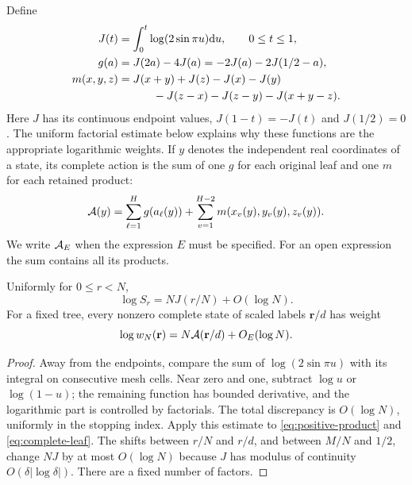 Define
\begin{align}
 J(t)&=\int_0^t\log(2\sin\pi u)\dd u,\qquad 0\le t\le1,
       \label{st:J}\\
 g(a)&=J(2a)-4J(a)
       =-2J(a)-2J(1/2-a),\label{st:g}\\
 m(x,y,z)&=J(x+y)+J(z)-J(x)-J(y)\notag\\
 &\hspace{11mm}-J(z-x)-J(z-y)-J(x+y-z).
       \label{st:m}
\end{align}
Here $J$ has its continuous endpoint values,
$J(1-t)=-J(t)$ and $J(1/2)=0$.
The uniform factorial estimate below explains why these functions
are the appropriate logarithmic weights. If $y$ denotes the independent
real coordinates of a state, its complete action is the sum of one $g$ for each
original leaf and one $m$ for each retained product:
\begin{equation}\label{st:action}
 \mathcal A(y)=\sum_{\ell=1}^H g(a_\ell(y))
             +\sum_{v=1}^{H-2}m(x_v(y),y_v(y),z_v(y)).
\end{equation}
We write $\mathcal A_E$ when the expression $E$ must be specified.
For an open expression the sum contains all its products.

\begin{lemma}\label{lem:factorial-action}
Uniformly for $0\le r<N$,
\[
 \log S_r=NJ(r/N)+O(\log N).
\]
For a fixed tree, every nonzero complete state of scaled labels $\mathbf r/d$ has weight
\begin{equation}\label{st:weight-rate}
 \log w_N(\mathbf r)=N\mathcal A(\mathbf r/d)+O_E(\log N).
\end{equation}
\end{lemma}
\begin{proof}
Away from the endpoints, compare the sum of $\log(2\sin\pi u)$ with its integral on consecutive mesh cells. Near zero and one, subtract $\log u$ or $\log(1-u)$; the remaining function has bounded derivative, and the logarithmic part is controlled by factorials. The total discrepancy is $O(\log N)$, uniformly in the stopping index. Apply this estimate to \eqref{eq:positive-product} and \eqref{eq:complete-leaf}. The shifts between $r/N$ and $r/d$, and between $M/N$ and $1/2$, change $NJ$ by at most $O(\log N)$ because $J$ has modulus of continuity $O(\delta|\log\delta|)$. There are a fixed number of factors.
\end{proof}

